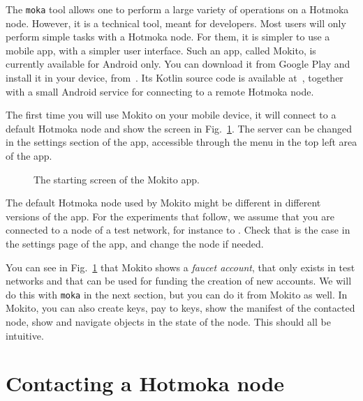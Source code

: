 The \texttt{moka} tool allows one to perform a large variety of operations
on a Hotmoka node. However, it is a technical tool, meant for developers.
Most users will only perform simple tasks with a Hotmoka node.
For them, it is simpler to use a mobile app, with a simpler user
interface. Such an app, called Mokito, is currently available for Android only.
You can download it from Google Play and install it in your device, from~\cite{mokito_google_play}.
Its Kotlin source code is available at~\cite{mokito_github},
together with a small Android service for connecting to a remote Hotmoka node.

The first time you will use Mokito on your mobile device,
it will connect to a default Hotmoka node
and show the screen in Fig.~\ref{fig:mokito_start}. The server can be changed
in the settings section of the app, accessible through the menu in the
top left area of the app.
%
\begin{figure}[t]
  \begin{center}
  \end{center}
  \caption{The starting screen of the Mokito app.}
  \label{fig:mokito_start}
\end{figure}
%
\begin{commentbox}
The default Hotmoka node used by Mokito might be different in different versions of the app.
For the experiments that follow, we assume that you are connected to a node
of a test network, for instance to \serverMokamint{}. Check that is the case
in the settings page of the app, and change the node if needed.
\end{commentbox}

You can see in Fig.~\ref{fig:mokito_start} that Mokito shows a \emph{faucet account},
that only exists in test networks and that can be used for funding the creation
of new accounts. We will do this with \texttt{moka} in the next section, but you
can do it from Mokito as well. In Mokito, you can also create keys, pay to keys,
show the manifest of the contacted node, show and navigate  objects in the state of the node.
This should all be intuitive.

\section{Contacting a Hotmoka node}\label{sec:contacting_node}

